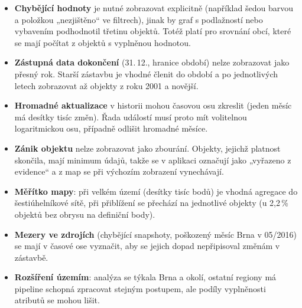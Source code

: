 \begin{itemize}
\item \textbf{Chybějící hodnoty} je nutné zobrazovat explicitně
  (například šedou barvou a položkou „nezjištěno“ ve filtrech), jinak by
  graf s podlažností nebo vybavením podhodnotil třetinu objektů. Totéž platí
  pro srovnání obcí, které se mají počítat z objektů s vyplněnou hodnotou.
\item \textbf{Zástupná data dokončení} (31.\,12., hranice období) nelze
  zobrazovat jako přesný rok. Starší zástavbu je vhodné členit do období
  a po jednotlivých letech zobrazovat až objekty z roku 2001 a novější.
\item \textbf{Hromadné aktualizace} v historii mohou časovou osu zkreslit
  (jeden měsíc má desítky tisíc změn). Řada událostí musí proto mít
  volitelnou logaritmickou osu, případně odlišit hromadné měsíce.
\item \textbf{Zánik objektu} nelze zobrazovat jako zbourání. Objekty, jejichž
  platnost skončila, mají minimum údajů, takže se v aplikaci označují jako
  „vyřazeno z evidence“ a z map se při výchozím zobrazení vynechávají.
\item \textbf{Měřítko mapy}: při velkém území (desítky tisíc bodů) je
  vhodná agregace do šestiúhelníkové sítě, při přiblížení se přechází na
  jednotlivé objekty (u 2,2\,\% objektů bez obrysu na definiční body).
\item \textbf{Mezery ve zdrojích} (chybějící snapshoty, poškozený měsíc Brna
  v 05/2016) se mají v časové ose vyznačit, aby se jejich dopad nepřipisoval
  změnám v zástavbě.
\item \textbf{Rozšíření územím}: analýza se týkala Brna a okolí, ostatní
  regiony má pipeline schopná zpracovat stejným postupem, ale podíly
  vyplněnosti atributů se mohou lišit.
\end{itemize}
